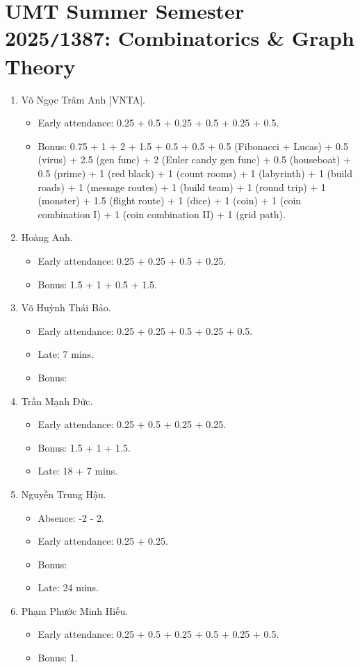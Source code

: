 \documentclass{article}
\begin{document}

\section{UMT Summer Semester 2025{\tt/}1387: Combinatorics \& Graph Theory}

\begin{enumerate}
	\item {\sc Võ Ngọc Trâm Anh [VNTA].}
	\begin{itemize}
		\item Early attendance: 0.25 + 0.5 + 0.25 + 0.5 + 0.25 + 0.5.
		\item Bonus: 0.75 + 1 + 2 + 1.5 + 0.5 + 0.5 + 0.5 (Fibonacci + Lucas) + 0.5 (virus) + 2.5 (gen func) + 2 (Euler candy gen func) + 0.5 (houseboat) + 0.5 (prime) + 1 (red black) + 1 (count rooms) + 1 (labyrinth) + 1 (build roads) + 1 (message routes) + 1 (build team) + 1 (round trip) + 1 (monster) + 1.5 (flight route) + 1 (dice) + 1 (coin) + 1 (coin combination I)  + 1 (coin combination II) + 1 (grid path).
	\end{itemize}
	\item {\sc Hoàng Anh.}
	\begin{itemize}
		\item Early attendance: 0.25 + 0.25 + 0.5 + 0.25.
		\item Bonus: 1.5 + 1 + 0.5 + 1.5.
	\end{itemize}
	\item {\sc Võ Huỳnh Thái Bảo.}
	\begin{itemize}
		\item Early attendance: 0.25 + 0.25 + 0.5 + 0.25 + 0.5.
		\item Late: 7 mins.
		\item Bonus: 
	\end{itemize}
	\item {\sc Trần Mạnh Đức.}
	\begin{itemize}
		\item Early attendance: 0.25 + 0.5 + 0.25 + 0.25.
		\item Bonus: 1.5 + 1 + 1.5.
		\item Late: 18 + 7 mins.
	\end{itemize}
	\item {\sc Nguyễn Trung Hậu.}
	\begin{itemize}
		\item Absence: -2 - 2.
		\item Early attendance: 0.25 + 0.25.
		\item Bonus:
		\item Late: 24 mins.
	\end{itemize}
	\item {\sc Phạm Phước Minh Hiếu.}
	\begin{itemize}
		\item Early attendance: 0.25 + 0.5 + 0.25 + 0.5 + 0.25 + 0.5.
		\item Bonus: 1.		
		

\end{itemize}
\end{enumerate}
\end{document}
